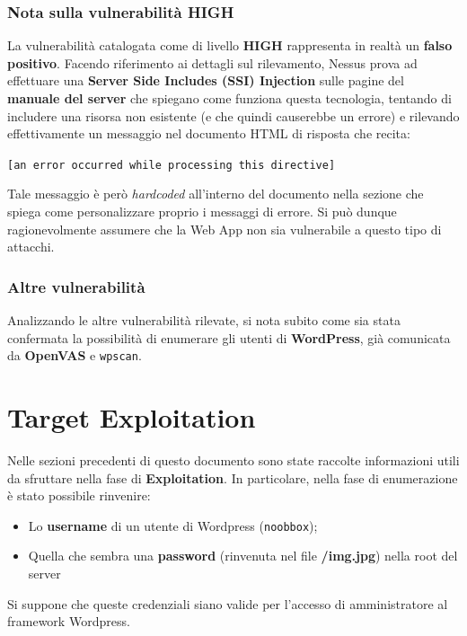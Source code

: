 \documentclass[a4paper, 12pt, oneside]{article}
\begin{document}
\subsubsection{Nota sulla vulnerabilità \textbf{HIGH}}
La vulnerabilità catalogata come di livello \textbf{HIGH} rappresenta in realtà un \textbf{falso positivo}. Facendo riferimento ai dettagli sul rilevamento, Nessus prova ad effettuare una \textbf{Server Side Includes (SSI) Injection} sulle pagine del \textbf{manuale del server} che spiegano come funziona questa tecnologia, tentando di includere una risorsa non esistente (e che quindi causerebbe un errore) e rilevando effettivamente un messaggio nel documento HTML di risposta che recita:

\begin{center}
    \texttt{[an error occurred while processing this directive]}
\end{center}

Tale messaggio è però \textit{hardcoded} all'interno del documento nella sezione che spiega come personalizzare proprio i messaggi di errore. Si può dunque ragionevolmente assumere che la Web App non sia vulnerabile a questo tipo di attacchi.

\subsubsection{Altre vulnerabilità}
Analizzando le altre vulnerabilità rilevate, si nota subito come sia stata confermata la possibilità di enumerare gli utenti di \textbf{WordPress}, già comunicata da \textbf{OpenVAS} e \texttt{wpscan}.
\newpage

\section{Target Exploitation}
Nelle sezioni precedenti di questo documento sono state raccolte informazioni utili da sfruttare nella fase di \textbf{Exploitation}. In particolare, nella fase di enumerazione è stato possibile rinvenire:

\begin{itemize}
    \item Lo \textbf{username} di un utente di Wordpress (\texttt{noobbox});
    \item Quella che sembra una \textbf{password} (rinvenuta nel file \textbf{/img.jpg}) nella root del server
\end{itemize}

Si suppone che queste credenziali siano valide per l'accesso di amministratore al framework Wordpress.
\end{document}
